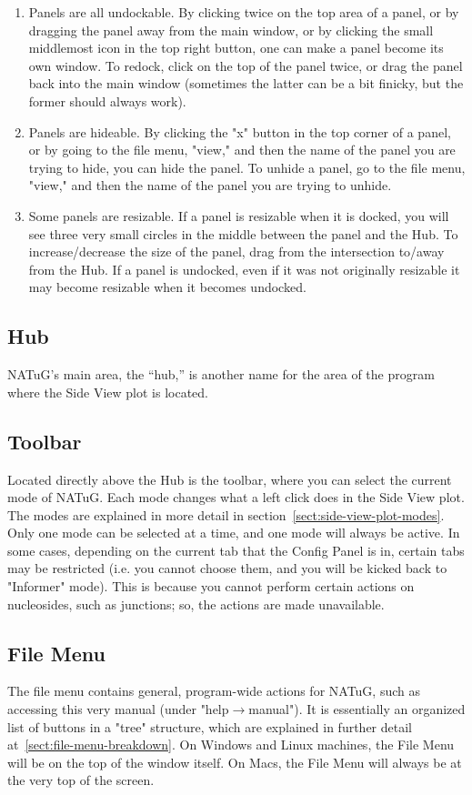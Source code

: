 \documentclass[
titlepage,
fontsize=12pt
]{article}
\begin{document}
	\begin{enumerate}
		\item Panels are all undockable. By clicking twice on the top area of a panel, or by dragging the panel away from the main window, or by clicking the small middlemost icon in the top right button, one can make a panel become its own window. To redock, click on the top of the panel twice, or drag the panel back into the main window (sometimes the latter can be a bit finicky, but the former should always work). 
		\item Panels are hideable. By clicking the "x" button in the top corner of a panel, or by going to the file menu, "view," and then the name of the panel you are trying to hide, you can hide the panel. To unhide a panel, go to the file menu, "view," and then the name of the panel you are trying to unhide. 
		\item Some panels are resizable. If a panel is resizable when it is docked, you will see three very small circles in the middle between the panel and the Hub. To increase/decrease the size of the panel, drag from the intersection to/away from the Hub. If a panel is undocked, even if it was not originally resizable it may become resizable when it becomes undocked.
	\end{enumerate}
	
	\subsection{Hub}
	NATuG’s main area, the “hub,” is another name for the area of the program where the Side View plot is located. 
	
	\subsection{Toolbar}
	Located directly above the Hub is the toolbar, where you can select the current mode of NATuG. Each mode changes what a left click does in the Side View plot. The modes are explained in more detail in section~\ref{sect:side-view-plot-modes}. Only one mode can be selected at a time, and one mode will always be active. In some cases, depending on the current tab that the Config Panel is in, certain tabs may be restricted (i.e. you cannot choose them, and you will be kicked back to "Informer" mode). This is because you cannot perform certain actions on nucleosides, such as junctions; so, the actions are made unavailable. 
	
	\subsection{File Menu}
	The file menu contains general, program-wide actions for NATuG, such as accessing this very manual (under "help$\rightarrow$manual"). It is essentially an organized list of buttons in a "tree" structure, which are explained in further detail at~\ref{sect:file-menu-breakdown}. On Windows and Linux machines, the File Menu will be on the top of the window itself. On Macs, the File Menu will always be at the very top of the screen.
	
\end{document}
